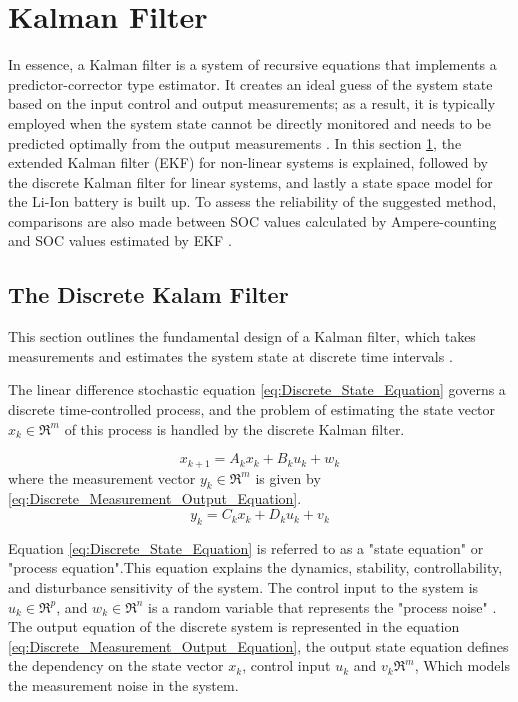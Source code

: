 \section{Kalman Filter}\label{sec:KalamanFilter}
In essence, a Kalman filter is a system of recursive equations that implements a predictor-corrector type estimator. It creates an ideal guess of the system state based on the input control and output measurements; as a result, it is typically employed when the system state cannot be directly monitored and needs to be predicted optimally from the output measurements \cite{SOC_Estimation_KalmanFilter_Ahmad}.
In this section \ref{sec:KalamanFilter}, the extended Kalman filter (EKF) for non-linear systems is explained, followed by the discrete Kalman filter for linear systems, and lastly a state space model for the Li-Ion battery is built up. To assess the reliability of the suggested method, comparisons are also made between SOC values calculated by Ampere-counting and SOC values estimated by EKF \cite{SOC_Estimation_KalmanFilter_Liu}.

\subsection{The Discrete Kalam Filter}\label{sec:Discrete_Kalam_Filter}
This section outlines the fundamental design of a Kalman filter, which takes measurements and estimates the system state at discrete time intervals \cite{LIPO_Batt_Parameters_identification_Rahmoun}.

The linear difference stochastic equation \ref{eq:Discrete_State_Equation} governs a discrete time-controlled process, and the problem of estimating the state vector $x_k \in \mathfrak{R}^m$ of this process is handled by the discrete Kalman filter.

\begin{equation}\label{eq:Discrete_State_Equation}
    x_{k+1} = A_k x_k + B_k u_k + w_k
\end{equation}
where the measurement vector $y_k \in \mathfrak{R}^m $ is given by \ref{eq:Discrete_Measurement_Output_Equation}.
\begin{equation}\label{eq:Discrete_Measurement_Output_Equation}
    y_{k} = C_k x_k + D_k u_k + v_k
\end{equation}

Equation \ref{eq:Discrete_State_Equation} is referred to as a "state equation" or "process equation".This equation explains the dynamics, stability, controllability, and disturbance sensitivity of the system.
The control input to the system is $u_k \in \mathfrak{R}^p$, and $w_k \in \mathfrak{R}^n$ is a random variable that represents the "process noise" \cite{SOC_Estimation_KalmanFilter_Ahmad}.
The output equation of the discrete system is represented in the equation \ref{eq:Discrete_Measurement_Output_Equation}, the output state equation defines the dependency on the state vector $x_k$, control input $u_k$ and $v_k \mathfrak{R}^{m}$, Which models the measurement noise in the system.


